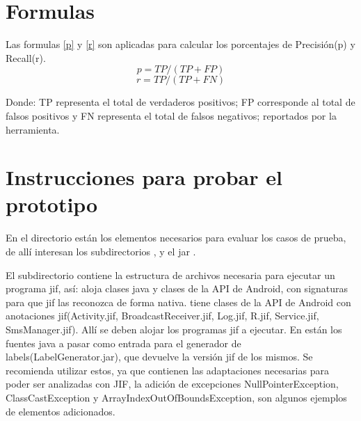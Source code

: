 \section{Formulas}
Las formulas \ref{p} y \ref{r} son aplicadas para calcular los porcentajes
de Precisión(p) y Recall(r).
\begin{equation}
\label{p}
	p = TP/(TP +FP) 
\end{equation}
\begin{equation}
\label{r}
	r = TP/(TP+FN)
\end{equation}

Donde: \newline
TP representa el total de verdaderos positivos; FP corresponde al total de
falsos positivos y  FN representa el total de falsos
negativos; reportados por la herramienta.\newline

\section{Instrucciones para probar el prototipo}
\label{sec:ejecutarPrototipo}
En el directorio \small{} están los elementos
necesarios para evaluar los casos de prueba, de allí interesan los
subdirectorios \small{},
\small{} y el jar
\small{}.

El subdirectorio \small{} contiene la estructura de
archivos necesaria para ejecutar un programa jif, así:
\small{} aloja clases java y clases de la API de Android, con
signaturas para que jif las reconozca de forma nativa.
\small{} tiene clases de la API de Android con
anotaciones jif(Activity.jif, BroadcastReceiver.jif, Log.jif, R.jif,
Service.jif, SmsManager.jif). Allí se deben alojar los programas jif a
ejecutar.\newline 
En {\small{}} están los fuentes java a pasar como
entrada para el generador de labels(LabelGenerator.jar), que devuelve la
versión jif de los mismos. Se recomienda utilizar estos, ya que contienen las
adaptaciones necesarias para poder ser analizadas con JIF, la adición de
excepciones NullPointerException, ClassCastException y
ArrayIndexOutOfBoundsException, son algunos ejemplos de elementos adicionados.

